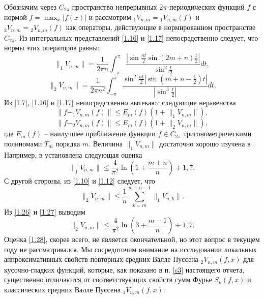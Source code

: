 Обозначим через $C_{2\pi}$ пространство непрерывных $2\pi$-периодических функций $f$  с нормой $f=\max_x|f(x)|$ и рассмотрим ${}_1 V_{n,m}={}_1 V_{n,m}(f)$ и ${}_2 V_{n,m}={}_2 V_{n,m}(f)$
как операторы, действующие в нормированном пространстве $C_{2\pi}$. Из интегральных представлений \eqref{1.16} и \eqref{1.17} непосредственно следует, что нормы этих операторов равны:
\begin{equation}\label{1.22}
\|_1V_{n,m}\|=\frac{1}{2\pi n}\int_{-\pi}^\pi \frac{|\sin\frac{nt}{2}\sin(2m+n)\frac{t}{2}|}{\sin^2\frac{t}{2}}dt,
 \end{equation}
\begin{equation}\label{1.23}
\|_2V_{n,m}\|=\frac{1}{2\pi n^2}\int_{-\pi}^\pi  \frac{\sin^2\frac{nt}{2}|\sin(m+n-\frac12)t|}{|\sin^3\frac{t}{2}|}dt.
 \end{equation}
Из \eqref{1.7}, \eqref{1.16}  и \eqref{1.17} непосредственно вытекают следующие неравенства
\begin{equation}\label{1.24}
\|f-_1V_{n,m}(f)\|\le E_m(f)(1+\|_1V_{n,m}\|),
 \end{equation}
\begin{equation}\label{1.25}
\|f-_2V_{n,m}(f)\|\le E_m(f)(1+\|_2V_{n,m}\|),
 \end{equation}
где $E_m(f)$ -- наилучшее приближение функции $f\in C_{2\pi}$ тригонометрическими полиномами $T_m$ порядка $m$. Величина $\|_1V_{n,m}\|$ достаточно хорошо изучена в  \cite{LapVPZhuk,LapVPNIK}. Например, в \cite{LapVPZhuk} установлена следующая оценка
\begin{equation}\label{1.26}
\|_1V_{n,m}\|\le \frac{4}{\pi^2}\ln\left(1+\frac{m+n}{n}\right)+1,7.
 \end{equation}
С другой стороны, из \eqref{1.10} и \eqref{1.12} следует, что
\begin{equation}\label{1.27}
\|_2V_{n,m}\|\le \frac1n\sum_{k=m}^{m+n-1}\|_1V_{n,k}\|.
 \end{equation}
Из \eqref{1.26} и \eqref{1.27} выводим
\begin{equation}\label{1.28}
\|_2V_{n,m}\|\le \frac{4}{\pi^2}\ln\left(3+\frac{m-1}{n}\right)+1,7.
 \end{equation}
Оценка \eqref{1.28}, скорее всего, не является окончательной, но этот вопрос в текущем году не рассматривался. Мы сосредоточим внимание на исследовании локальных аппроксимативных свойств повторных средних Валле Пуссена $_2V_{n,m}(f,x)$ для кусочно-гладких функций, которые, как показано в п. \ref{s3}
настоящего отчета, существенно отличаются от соответствующих свойств  сумм Фурье $S_k(f,x)$ и классических средних Валле Пуссена $_1V_{n,m}(f,x)$.
